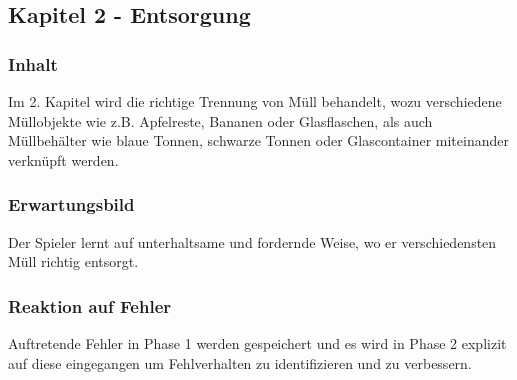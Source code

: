 \documentclass[a4paper]{article}
\begin{document}
    \subsection{Kapitel 2 - Entsorgung}
        \subsubsection{Inhalt}
            Im 2. Kapitel wird die richtige Trennung von Müll behandelt, wozu verschiedene Müllobjekte wie z.B. Apfelreste, Bananen oder Glasflaschen, als auch Müllbehälter wie blaue Tonnen, schwarze Tonnen oder Glascontainer miteinander verknüpft werden.
        \subsubsection{Erwartungsbild}
            Der Spieler lernt auf unterhaltsame und fordernde Weise, wo er verschiedensten Müll richtig entsorgt.
        \subsubsection{Reaktion auf Fehler}
            Auftretende Fehler in Phase 1 werden gespeichert und es wird in Phase 2 explizit auf diese eingegangen um Fehlverhalten zu identifizieren und zu verbessern.
\end{document}
